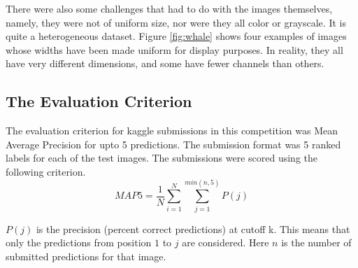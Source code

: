 There were also some challenges that had to do with the images themselves, namely, they were not of uniform size, nor were they all color or grayscale. It is quite a heterogeneous dataset. Figure \ref{fig:whale} shows four examples of images whose widths have been made uniform for display purposes. In reality, they all have very different dimensions, and some have fewer channels than others.\\

\subsection{The Evaluation Criterion}

The evaluation criterion for kaggle submissions in this competition was Mean Average Precision for upto 5 predictions. The submission format was 5 ranked labels for each of the test images. The submissions were scored using the following criterion.\\

$$
MAP5 = \frac{1}{N} \sum_{i=1}^{N} \sum_{j=1}^{min(n,5)} P(j)
$$

$P(j)$ is the precision (percent correct predictions) at cutoff k. This means that only the predictions from position $1$ to $j$ are considered. Here $n$ is the number of submitted predictions for that image.  